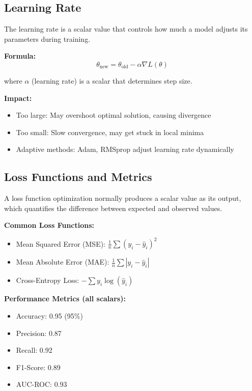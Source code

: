 \documentclass[11pt,a4paper]{article}
\begin{document}
\subsection{Learning Rate}

The learning rate is a scalar value that controls how much a model adjusts its parameters during training.

\textbf{Formula:}
\begin{equation}
    \theta_{\text{new}} = \theta_{\text{old}} - \alpha \nabla L(\theta)
\end{equation}

where $\alpha$ (learning rate) is a scalar that determines step size.

\textbf{Impact:}
\begin{itemize}
    \item Too large: May overshoot optimal solution, causing divergence
    \item Too small: Slow convergence, may get stuck in local minima
    \item Adaptive methods: Adam, RMSprop adjust learning rate dynamically
\end{itemize}

\subsection{Loss Functions and Metrics}

A loss function optimization normally produces a scalar value as its output, which quantifies the difference between expected and observed values.

\textbf{Common Loss Functions:}
\begin{itemize}
    \item Mean Squared Error (MSE): $\frac{1}{n}\sum(y_i - \hat{y}_i)^2$
    \item Mean Absolute Error (MAE): $\frac{1}{n}\sum|y_i - \hat{y}_i|$
    \item Cross-Entropy Loss: $-\sum y_i \log(\hat{y}_i)$
\end{itemize}

\textbf{Performance Metrics (all scalars):}
\begin{itemize}
    \item Accuracy: 0.95 (95\%)
    \item Precision: 0.87
    \item Recall: 0.92
    \item F1-Score: 0.89
    \item AUC-ROC: 0.93
\end{itemize}
\end{document}
